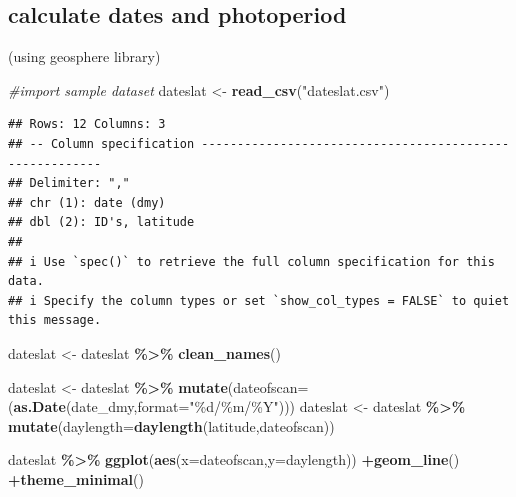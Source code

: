 \documentclass[
]{article}
\newenvironment{Shaded}{\begin{snugshade}}{\end{snugshade}}
\newcommand{\AttributeTok}[1]{\textcolor[rgb]{0.13,0.29,0.53}{#1}}
\newcommand{\CommentTok}[1]{\textcolor[rgb]{0.56,0.35,0.01}{\textit{#1}}}
\newcommand{\FunctionTok}[1]{\textcolor[rgb]{0.13,0.29,0.53}{\textbf{#1}}}
\newcommand{\NormalTok}[1]{#1}
\newcommand{\OtherTok}[1]{\textcolor[rgb]{0.56,0.35,0.01}{#1}}
\newcommand{\SpecialCharTok}[1]{\textcolor[rgb]{0.81,0.36,0.00}{\textbf{#1}}}
\newcommand{\StringTok}[1]{\textcolor[rgb]{0.31,0.60,0.02}{#1}}
\begin{document}
\hypertarget{calculate-dates-and-photoperiod}{%
\subsection{calculate dates and photoperiod}\label{calculate-dates-and-photoperiod}}

(using geosphere library)

\begin{Shaded}
\begin{Highlighting}[]
\CommentTok{\#import sample dataset}
\NormalTok{dateslat }\OtherTok{\textless{}{-}} \FunctionTok{read\_csv}\NormalTok{(}\StringTok{"dateslat.csv"}\NormalTok{)}
\end{Highlighting}
\end{Shaded}

\begin{verbatim}
## Rows: 12 Columns: 3
## -- Column specification --------------------------------------------------------
## Delimiter: ","
## chr (1): date (dmy)
## dbl (2): ID's, latitude
## 
## i Use `spec()` to retrieve the full column specification for this data.
## i Specify the column types or set `show_col_types = FALSE` to quiet this message.
\end{verbatim}

\begin{Shaded}
\begin{Highlighting}[]
\NormalTok{dateslat }\OtherTok{\textless{}{-}}\NormalTok{ dateslat }\SpecialCharTok{\%\textgreater{}\%}
  \FunctionTok{clean\_names}\NormalTok{()}

\NormalTok{dateslat }\OtherTok{\textless{}{-}}\NormalTok{ dateslat }\SpecialCharTok{\%\textgreater{}\%} \FunctionTok{mutate}\NormalTok{(}\AttributeTok{dateofscan=}\NormalTok{(}\FunctionTok{as.Date}\NormalTok{(date\_dmy,}\AttributeTok{format=}\StringTok{"\%d/\%m/\%Y"}\NormalTok{)))}
\NormalTok{dateslat }\OtherTok{\textless{}{-}}\NormalTok{ dateslat }\SpecialCharTok{\%\textgreater{}\%} \FunctionTok{mutate}\NormalTok{(}\AttributeTok{daylength=}\FunctionTok{daylength}\NormalTok{(latitude,dateofscan))}
                                
\NormalTok{dateslat }\SpecialCharTok{\%\textgreater{}\%} \FunctionTok{ggplot}\NormalTok{(}\FunctionTok{aes}\NormalTok{(}\AttributeTok{x=}\NormalTok{dateofscan,}\AttributeTok{y=}\NormalTok{daylength)) }\SpecialCharTok{+}\FunctionTok{geom\_line}\NormalTok{() }\SpecialCharTok{+}\FunctionTok{theme\_minimal}\NormalTok{()}
\end{Highlighting}
\end{Shaded}
\end{document}
